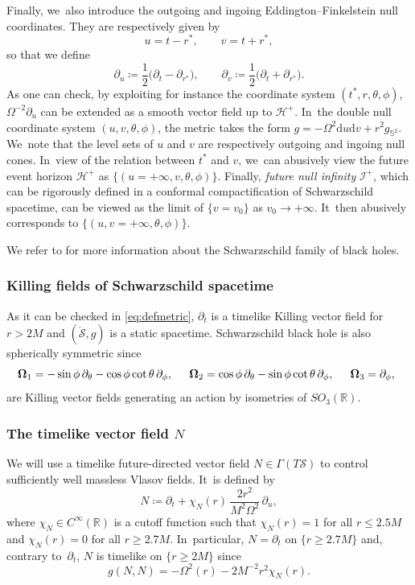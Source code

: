 \documentclass[10pt]{amsart}
\theoremstyle{plain}
\theoremstyle{definition}
\newcommand\R{{\mathbb{R}}}
\newcommand\dr{{\mathrm{d}}}
\begin{document}
Finally, we~also introduce the outgoing and ingoing Eddington--Finkelstein null coordinates. They are respectively given by
\[
u=t-r^*, \qquad v=t+r^*,
\]
so that we define
\[
\partial_u \coloneqq \frac{1}{2} \bigl(\partial_t - \partial_{r^*} \bigr), \qquad \partial_v \coloneqq \frac{1}{2} \bigl(\partial_t + \partial_{r^*} \bigr).
\]
As one can check, by exploiting for instance the coordinate system $(t^*,r,\theta,\phi)$, $\Omega^{-2} \partial_u$ can be extended as a smooth vector field up to $\mathcal{H}^+$. In~the double null coordinate system $(u,v,\theta,\phi)$, the metric takes the form $g=-\Omega^2 \dr u \dr v +r^2 g_{\mathbb{S}^2}$. We~note that the level sets of $u$ and $v$ are respectively outgoing and ingoing null cones. In~view of the relation between $t^*$ and $v$, we~can abusively view the future event horizon $\mathcal{H}^+$ as $\{(u=+\infty, v,\theta,\phi)\}$. Finally, \textit{future null infinity} $\mathcal{I}^{+}$, which can be rigorously defined in a conformal compactification of Schwarzschild spacetime, can be viewed as the limit of $\{v=v_0\}$ as $v_0 \to +\infty$. It~then abusively corresponds to $\{(u,v=+\infty,\theta,\phi)\}$.

We refer to \cite[Ch.\,13]{O83} for more information about the Schwarzschild family of black holes.

\subsubsection{Killing fields of Schwarzschild spacetime}

As it can be checked in \eqref{eq:defmetric}, $\partial_t$ is a timelike Killing vector field for $r>2M$ and $(\mathring{\mathcal{S}},g)$ is a static spacetime. Schwarzschild black hole is also spherically symmetric since
\begin{equation}\label{killing_sph_symm}
\hspace{-1.8mm} \mathbf{\Omega}_1=-\sin \phi\,\partial_{\theta}-\cos \phi\cot\theta\,\partial_{\phi}, \quad \; \, \mathbf{\Omega}_2=\cos \phi \,\partial_{\theta}-\sin\phi \cot \theta \,\partial_{\phi},\quad \; \, \mathbf{\Omega}_3=\partial_{\phi},
\end{equation}
are Killing vector fields generating an action by isometries of $SO_3(\R)$.

\subsubsection{The timelike vector field $N$} We will use a timelike future-directed vector field $N \in \Gamma(T\mathcal{S})$ to control sufficiently well massless Vlasov fields. It~is defined by
\[
N \coloneqq \partial_t+ \chi_N (r)\, \frac{2r^2}{M^2\Omega^2}\, \partial_u,
\]
where $\chi_N \in C^\infty (\R)$ is a cutoff function such that $\chi_N (r)=1$ for all $r \leq 2.5M$ and $\chi_N (r) =0$ for all $r \geq 2.7M$. In~particular, $N=\partial_t$ on $\{ r \geq 2.7M \}$ and, contrary to~$\partial_t$, $N$ is timelike on $\{ r \geq 2M \}$ since
\[
g(N,N)=-\Omega^2(r)-2M^{-2}r^2 \chi_N (r).
\]
\end{document}
